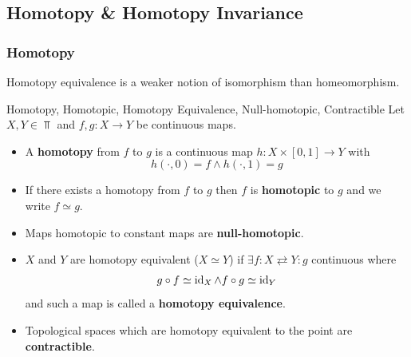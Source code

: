 \newpage

\subsection{Homotopy \& Homotopy Invariance}


\subsubsection{Homotopy}

Homotopy equivalence is a weaker notion of isomorphism than homeomorphism.

\begin{definition}{Homotopy, Homotopic, Homotopy Equivalence, Null-homotopic, Contractible}{}
  Let $X,Y\in\Top$ and $f,g:X\to Y$ be continuous maps.
  \begin{itemize}
    \item A \textbf{homotopy} from $f$ to $g$ is a continuous map $h:X\times[0,1]\to Y$ with \[h(\cdot,0)=f \land h(\cdot,1)=g\]
    \item If there exists a homotopy from $f$ to $g$ then $f$ is \textbf{homotopic} to $g$ and we write $f\simeq g$.
    \item Maps homotopic to constant maps are \textbf{null-homotopic}.
    \item $X$ and $Y$ are homotopy equivalent ($X\simeq Y$) if $\exists f:X\rightleftarrows Y:g$ continuous where \[
    g\circ f\simeq \operatorname{id}_X \land f\circ g\simeq \operatorname{id}_Y
    \]
    and such a map is called a \textbf{homotopy equivalence}.
    \item Topological spaces which are homotopy equivalent to the point are \textbf{contractible}.
  \end{itemize}
\end{definition}

